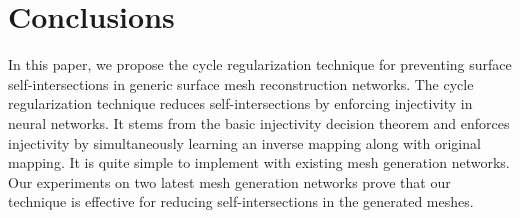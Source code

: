 \section{Conclusions}
In this paper, we propose the cycle regularization technique for preventing surface self-intersections in generic surface mesh reconstruction networks. The cycle regularization technique reduces self-intersections by enforcing injectivity in neural networks. It stems from the basic injectivity decision theorem and enforces injectivity by simultaneously learning an inverse mapping along with original mapping. It is quite simple to implement with existing mesh generation networks. Our experiments on two latest mesh generation networks prove that our technique is effective for reducing self-intersections in the generated meshes.